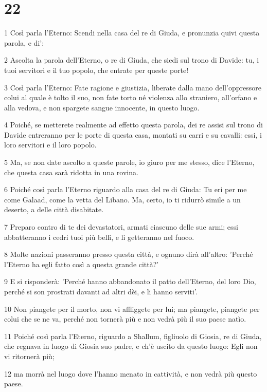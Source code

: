 \chapter{22}

\par 1 Così parla l'Eterno: Scendi nella casa del re di Giuda, e pronunzia quivi questa parola, e di':
\par 2 Ascolta la parola dell'Eterno, o re di Giuda, che siedi sul trono di Davide: tu, i tuoi servitori e il tuo popolo, che entrate per queste porte!
\par 3 Così parla l'Eterno: Fate ragione e giustizia, liberate dalla mano dell'oppressore colui al quale è tolto il suo, non fate torto né violenza allo straniero, all'orfano e alla vedova, e non spargete sangue innocente, in questo luogo.
\par 4 Poiché, se metterete realmente ad effetto questa parola, dei re assisi sul trono di Davide entreranno per le porte di questa casa, montati su carri e su cavalli: essi, i loro servitori e il loro popolo.
\par 5 Ma, se non date ascolto a queste parole, io giuro per me stesso, dice l'Eterno, che questa casa sarà ridotta in una rovina.
\par 6 Poiché così parla l'Eterno riguardo alla casa del re di Giuda: Tu eri per me come Galaad, come la vetta del Libano. Ma, certo, io ti ridurrò simile a un deserto, a delle città disabitate.
\par 7 Preparo contro di te dei devastatori, armati ciascuno delle sue armi; essi abbatteranno i cedri tuoi più belli, e li getteranno nel fuoco.
\par 8 Molte nazioni passeranno presso questa città, e ognuno dirà all'altro: 'Perché l'Eterno ha egli fatto così a questa grande città?'
\par 9 E si risponderà: 'Perché hanno abbandonato il patto dell'Eterno, del loro Dio, perché si son prostrati davanti ad altri dèi, e li hanno serviti'.
\par 10 Non piangete per il morto, non vi affliggete per lui; ma piangete, piangete per colui che se ne va, perché non tornerà più e non vedrà più il suo paese natìo.
\par 11 Poiché così parla l'Eterno, riguardo a Shallum, figliuolo di Giosia, re di Giuda, che regnava in luogo di Giosia suo padre, e ch'è uscito da questo luogo: Egli non vi ritornerà più;
\par 12 ma morrà nel luogo dove l'hanno menato in cattività, e non vedrà più questo paese.
